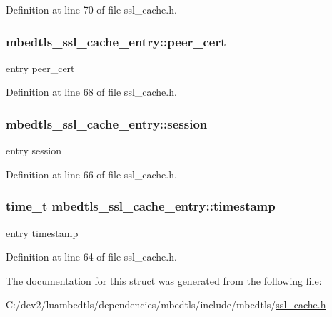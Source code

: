 Definition at line 70 of file ssl\-\_\-cache.\-h.

\hypertarget{structmbedtls__ssl__cache__entry_aaa3550f088fef5e3e2ea793076d77a86}{
\subsubsection[{peer\-\_\-cert}]{ mbedtls\-\_\-ssl\-\_\-cache\-\_\-entry\-::peer\-\_\-cert}}\label{structmbedtls__ssl__cache__entry_aaa3550f088fef5e3e2ea793076d77a86}
entry peer\-\_\-cert 

Definition at line 68 of file ssl\-\_\-cache.\-h.

\hypertarget{structmbedtls__ssl__cache__entry_ade27f016c0924422c5ba5e68650744bc}{
\subsubsection[{session}]{ mbedtls\-\_\-ssl\-\_\-cache\-\_\-entry\-::session}}\label{structmbedtls__ssl__cache__entry_ade27f016c0924422c5ba5e68650744bc}
entry session 

Definition at line 66 of file ssl\-\_\-cache.\-h.

\hypertarget{structmbedtls__ssl__cache__entry_a20ad0e16bcfb45eadfb821bff0301ec3}{
\subsubsection[{timestamp}]{\setlength{\rightskip}{0pt plus 5cm}time\-\_\-t mbedtls\-\_\-ssl\-\_\-cache\-\_\-entry\-::timestamp}}\label{structmbedtls__ssl__cache__entry_a20ad0e16bcfb45eadfb821bff0301ec3}
entry timestamp 

Definition at line 64 of file ssl\-\_\-cache.\-h.



The documentation for this struct was generated from the following file\-:\begin{DoxyCompactItemize}
\item 
C\-:/dev2/luambedtls/dependencies/mbedtls/include/mbedtls/\hyperlink{ssl__cache_8h}{ssl\-\_\-cache.\-h}\end{DoxyCompactItemize}
